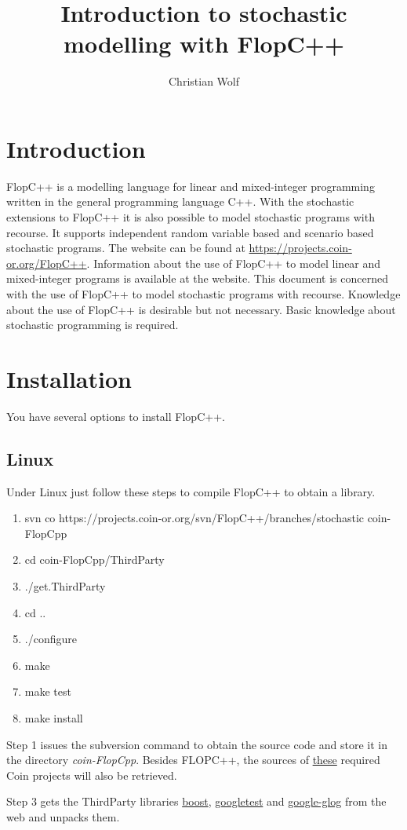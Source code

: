 \documentclass[a4paper,10pt,pdftex]{scrartcl}
\author{Christian Wolf}
\title{Introduction to stochastic modelling with FlopC++}
\begin{document}
 \section{Introduction}
  FlopC++ is a modelling language for linear and mixed-integer programming written in the general programming language C++. With the stochastic extensions to FlopC++ it is also possible to model stochastic programs with recourse. It supports independent random variable based and scenario based stochastic programs. The website can be found at \url{https://projects.coin-or.org/FlopC++}. Information about the use of FlopC++ to model linear and mixed-integer programs is available at the website. This document is concerned with the use of FlopC++ to model stochastic programs with recourse. Knowledge about the use of FlopC++ is desirable but not necessary. Basic knowledge about stochastic programming is required.

 \section{Installation}
 You have several options to install FlopC++.
 \subsection{Linux}
Under Linux just follow these steps to compile FlopC++ to obtain a library.
\begin{enumerate}
\item svn co https://projects.coin-or.org/svn/FlopC++/branches/stochastic coin-FlopCpp 
\item cd coin-FlopCpp/ThirdParty
\item ./get.ThirdParty
\item cd .. 
\item ./configure 
\item make 
\item make test 
\item make install
\end{enumerate}

Step 1 issues the subversion command to obtain the source code and store it in the directory \emph{coin-FlopCpp}. Besides FLOPC++, the sources of \href{thttps://projects.coin-or.org/FlopC++/browser/trunk/Externals?format=raw}{these} required Coin projects will also be retrieved. 

Step 3 gets the ThirdParty libraries \href{http://www.boost.org/}{boost}, \href{http://code.google.com/p/googletest/}{googletest} and \href{http://code.google.com/p/google-glog/}{google-glog} from the web and unpacks them.
\end{document}

